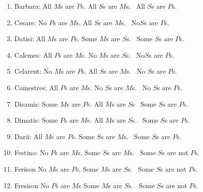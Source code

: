 \begin{enumerate}[label=\arabic*), topsep=0pt, parsep=0pt, itemsep=3pt]
\item Barbara: All $M$s are $P$s. All $S$s are $M$s. \therefore\ All $S$s are $P$s. 
\item Cesare: No $P$s are $M$s. All $S$s are $M$s. \therefore\   No$S$s are $P$s.  	
\item Datisi: All $M$s are $P$s. Some $M$s are $S$s. \therefore\   Some $S$s are $P$s.  	 
\item Calemes: All $P$s are $M$s. No $M$s are $S$s. \therefore\  No$S$s are $P$s. 
\item Celarent: No $M$s are $P$s. All $S$s are $M$s.  \therefore\   No $S$s are $P$s.  	
\item Camestres: All $P$s are $M$s. No $S$s are $M$s.  \therefore\   No $S$s are $P$s.  	
\item Disamis: 	Some $M$s are $P$s. All $M$s are $S$s \therefore\   Some $S$s are $P$s.  	
\item Dimatis: Some $P$s are $M$s. All $M$s are $S$s. \therefore\   Some $S$s are $P$s. 
\item Darii: All $M$s are $P$s. Some $S$s are $M$s. \therefore\   Some $S$s are $P$s.  	
\item Festino: No $P$s are $M$s. Some $S$s are $M$s. \therefore\   Some $S$s are not $P$s.  	
\item Ferison No $M$s are $P$s. Some $M$s are $S$s. \therefore\   Some $S$s are not $P$s.  
\item Fresison No $P$s are $M$s Some $M$s are $S$s. \therefore\   Some $S$s are not $P$s.  
\end{enumerate}

